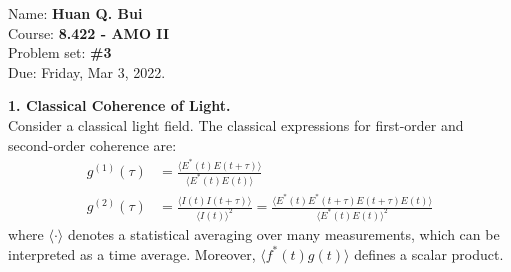 \documentclass{article}
\theoremstyle{definition}
\newcommand{\f}[2]{\frac{#1}{#2}}
\begin{document}
\begin{framed}
\noindent Name: \textbf{Huan Q. Bui}\\
Course: \textbf{8.422 - AMO II}\\
Problem set: \textbf{\#3}\\
Due: Friday, Mar 3, 2022.
\end{framed}
	
	
\noindent \textbf{1. Classical Coherence of Light.} \\

\noindent Consider a classical light field. The classical expressions for first-order and second-order coherence are:
\begin{align*}
g^{(1)}(\tau) &= \f{\langle E^*(t) E (t+\tau)\rangle}{\langle E^*(t) E(t) \rangle} \\
g^{(2)}(\tau) &= \f{\langle I(t) I (t+\tau) \rangle }{\langle I(t) \rangle^2} 
= \f{\langle  E^*(t) E^*(t+\tau) E(t+\tau) E(t)   \rangle }{\langle E^*(t) E(t) \rangle^2}
\end{align*}
where $\langle \cdot \rangle$ denotes a statistical averaging over many measurements, which can be interpreted as a time average. Moreover, $\langle f^*(t) g(t)\rangle$ defines a scalar product. 
\end{document}
